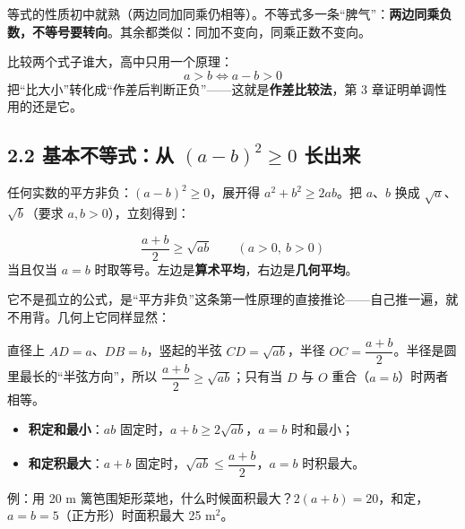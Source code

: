 \documentclass[UTF8,a4paper,11pt]{ctexart}
\begin{document}
等式的性质初中就熟（两边同加同乘仍相等）。不等式多一条“脾气”：\textbf{两边同乘负数，不等号要转向}。其余都类似：同加不变向，同乘正数不变向。

比较两个式子谁大，高中只用一个原理：
\[
a > b \iff a - b > 0
\]
把“比大小”转化成“作差后判断正负”——这就是\textbf{作差比较法}，第 3 章证明单调性用的还是它。

\subsection*{2.2 基本不等式：从 $(a-b)^2 \geq 0$ 长出来}

任何实数的平方非负：$(a-b)^2 \geq 0$，展开得 $a^2 + b^2 \geq 2ab$。把 $a$、$b$ 换成 $\sqrt{a}$、$\sqrt{b}$（要求 $a, b > 0$），立刻得到：

\begin{keyconcept}[基本不等式]
\[
\frac{a+b}{2} \geq \sqrt{ab} \qquad (a > 0,\ b > 0)
\]
当且仅当 $a = b$ 时取等号。左边是\textbf{算术平均}，右边是\textbf{几何平均}。
\end{keyconcept}

它不是孤立的公式，是“平方非负”这条第一性原理的直接推论——自己推一遍，就不用背。几何上它同样显然：

\begin{center}
\end{center}

直径上 $AD = a$、$DB = b$，竖起的半弦 $CD = \sqrt{ab}$，半径 $OC = \dfrac{a+b}{2}$。半径是圆里最长的“半弦方向”，所以 $\dfrac{a+b}{2} \geq \sqrt{ab}$；只有当 $D$ 与 $O$ 重合（$a = b$）时两者相等。

\begin{keyconcept}
\begin{itemize}
  \item \textbf{积定和最小}：$ab$ 固定时，$a+b \geq 2\sqrt{ab}$，$a = b$ 时和最小；
  \item \textbf{和定积最大}：$a+b$ 固定时，$\sqrt{ab} \leq \dfrac{a+b}{2}$，$a = b$ 时积最大。
\end{itemize}
例：用 20 m 篱笆围矩形菜地，什么时候面积最大？$2(a+b)=20$，和定，$a=b=5$（正方形）时面积最大 25 m$^2$。
\end{keyconcept}
\end{document}

